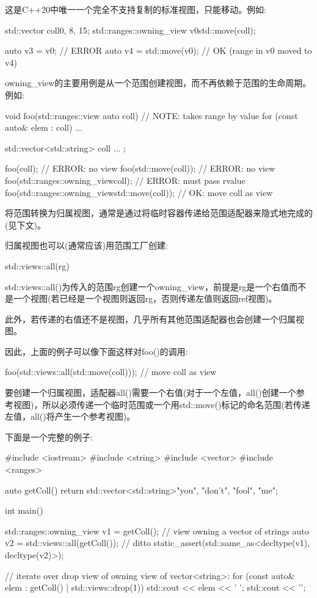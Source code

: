 这是C++20中唯一一个完全不支持复制的标准视图，只能移动。例如:

\begin{cpp}
std::vector coll{0, 8, 15};
std::ranges::owning_view v0{std::move(coll)};

auto v3 = v0; // ERROR
auto v4 = std::move(v0); // OK (range in v0 moved to v4)
\end{cpp}

owning\_view的主要用例是从一个范围创建视图，而不再依赖于范围的生命周期。例如:

\begin{cpp}
void foo(std::ranges::view auto coll) // NOTE: takes range by value
{
	for (const auto& elem : coll) {
		...
	}
}

std::vector<std::string> coll{ ... };

foo(coll); // ERROR: no view
foo(std::move(coll)); // ERROR: no view
foo(std::ranges::owning_view{coll}); // ERROR: must pass rvalue
foo(std::ranges::owning_view{std::move(coll)}); // OK: move coll as view
\end{cpp}

将范围转换为归属视图，通常是通过将临时容器传递给范围适配器来隐式地完成的(见下文)。


归属视图也可以(通常应该)用范围工厂创建:

\begin{cpp}
std::views::all(rg)
\end{cpp}

std::views::all()为传入的范围rg创建一个owning\_view，前提是rg是一个右值而不是一个视图(若已经是一个视图则返回rg，否则传递左值则返回ref视图)。

此外，若传递的右值还不是视图，几乎所有其他范围适配器也会创建一个归属视图。

因此，上面的例子可以像下面这样对foo()的调用:

\begin{cpp}
foo(std::views::all(std::move(coll))); // move coll as view
\end{cpp}

要创建一个归属视图，适配器all()需要一个右值(对于一个左值，all()创建一个参考视图)，所以必须传递一个临时范围或一个用std::move()标记的命名范围(若传递左值，all()将产生一个参考视图)。

下面是一个完整的例子:


\begin{cpp}
#include <iostream>
#include <string>
#include <vector>
#include <ranges>

auto getColl()
{
	return std::vector<std::string>{"you", "don't", "fool", "me"};
}

int main()
{
	std::ranges::owning_view v1 = getColl(); // view owning a vector of strings
	auto v2 = std::views::all(getColl()); // ditto
	static_assert(std::same_as<decltype(v1), decltype(v2)>);
	
	// iterate over drop view of owning view of vector<string>:
	for (const auto& elem : getColl() | std::views::drop(1)) {
		std::cout << elem << ' ';
	}
	std::cout << '\n';
}
\end{cpp}

